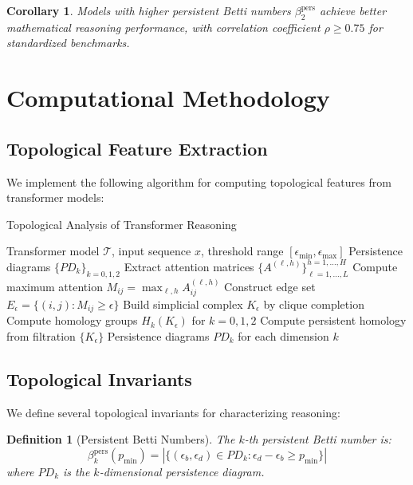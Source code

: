 \documentclass[11pt,a4paper]{article}
\newtheorem{corollary}[theorem]{Corollary}
\newtheorem{definition}[theorem]{Definition}
\begin{document}
\begin{corollary}
Models with higher persistent Betti numbers $\beta_2^{\text{pers}}$ achieve better mathematical reasoning performance, with correlation coefficient $\rho \geq 0.75$ for standardized benchmarks.
\end{corollary}

\section{Computational Methodology}

\subsection{Topological Feature Extraction}

We implement the following algorithm for computing topological features from transformer models:

\begin{algorithm}
\caption{Topological Analysis of Transformer Reasoning}
\begin{algorithmic}[1]
\REQUIRE Transformer model $\mathcal{T}$, input sequence $x$, threshold range $[\epsilon_{\min}, \epsilon_{\max}]$
\ENSURE Persistence diagrams $\{PD_k\}_{k=0,1,2}$
\STATE Extract attention matrices $\{A^{(\ell,h)}\}_{\ell=1,\ldots,L}^{h=1,\ldots,H}$
\STATE Compute maximum attention $M_{ij} = \max_{\ell,h} A^{(\ell,h)}_{ij}$
    \STATE Construct edge set $E_\epsilon = \{(i,j) : M_{ij} \geq \epsilon\}$
    \STATE Build simplicial complex $K_\epsilon$ by clique completion
    \STATE Compute homology groups $H_k(K_\epsilon)$ for $k = 0,1,2$
\ENDFOR
\STATE Compute persistent homology from filtration $\{K_\epsilon\}$
\RETURN Persistence diagrams $PD_k$ for each dimension $k$
\end{algorithmic}
\end{algorithm}

\subsection{Topological Invariants}

We define several topological invariants for characterizing reasoning:

\begin{definition}[Persistent Betti Numbers]
The $k$-th persistent Betti number is:
$$\beta_k^{\text{pers}}(p_{\min}) = |\{(\epsilon_b, \epsilon_d) \in PD_k : \epsilon_d - \epsilon_b \geq p_{\min}\}|$$
where $PD_k$ is the $k$-dimensional persistence diagram.
\end{definition}
\end{document}
